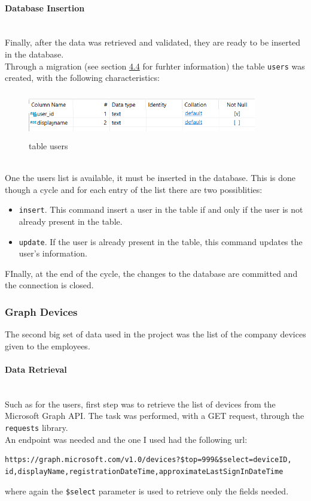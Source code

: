 \documentclass[12pt, a4paper, oneside]{article}
\begin{document}
\paragraph{Database Insertion} ~\\
Finally, after the data was retrieved and validated, they are ready to be inserted in the database.\\
Through a migration (see section \hyperref[subsec:migrations]{4.4} for furhter information) the table \texttt{users} was created, with the following characteristics:
\begin{figure}[h]
    \centering
    \includegraphics[width=10cm, height=2cm]{table-users.png}
    \caption{table users}
\end{figure}\\

One the users list is available, it must be inserted in the database. This is done though a cycle and for each entry of the list there are two possiblities:
\begin{itemize}
    \item \texttt{insert}. This command insert a user in the table if and only if the user is not already present in the table.
    \item \texttt{update}. If the user is already present in the table, this command updates the user's information.
\end{itemize}
FInally, at the end of the cycle, the changes to the database are committed and the connection is closed.

\newpage
\subsubsection{Graph Devices}
The second big set of data used in the project was the list of the company devices given to the employees.

\paragraph{Data Retrieval} ~\\
Such as for the users, first step was to retrieve the list of devices from the Microsoft Graph API. The task was performed, with a GET request, through the \texttt{requests} library.\\
An endpoint was needed and the one I used had the following url:  
\begin{Verbatim}[fontsize=\small]
https://graph.microsoft.com/v1.0/devices?$top=999&$select=deviceID,
id,displayName,registrationDateTime,approximateLastSignInDateTime
\end{Verbatim}
where again the \texttt{\$select} parameter is used to retrieve only the fields needed.
\end{document}
